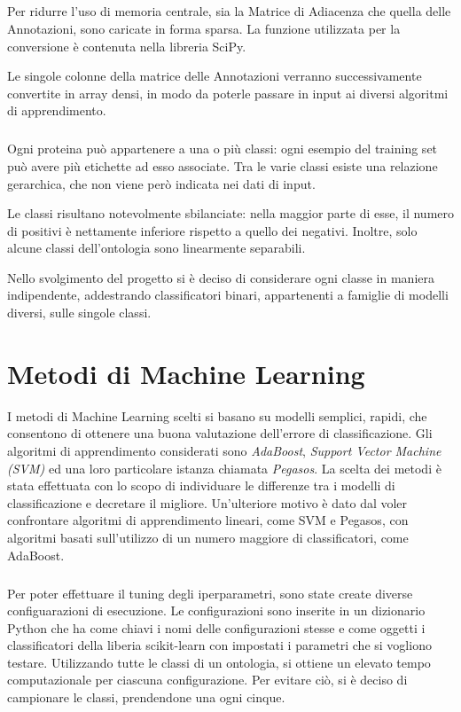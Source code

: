 \documentclass[12pt,a4paper,oneside,hidelinks]{report}
\begin{document}
\paragraph*{} 
Per ridurre l'uso di memoria centrale, sia la Matrice di Adiacenza che quella delle Annotazioni, sono caricate in forma sparsa. La funzione utilizzata per la conversione è contenuta nella libreria SciPy.

Le singole colonne della matrice delle Annotazioni verranno successivamente convertite in array densi, in modo da poterle passare in input ai diversi algoritmi di apprendimento. 

\paragraph*{}
Ogni proteina può appartenere a una o più classi: ogni esempio del training set può avere più etichette ad esso associate. Tra le varie classi esiste una relazione gerarchica, che non viene però indicata nei dati di input.

Le classi risultano notevolmente sbilanciate: nella maggior parte di esse, il numero di positivi è nettamente inferiore rispetto a quello dei negativi. Inoltre, solo alcune classi dell'ontologia sono linearmente separabili. 

Nello svolgimento del progetto si è deciso di considerare ogni classe in maniera indipendente, addestrando classificatori binari, appartenenti a famiglie di modelli diversi, sulle singole classi.


\chapter{Metodi di Machine Learning} 
\label{chap:metodi}

I metodi di Machine Learning scelti si basano su modelli semplici, rapidi, che consentono di ottenere una buona valutazione dell'errore di classificazione. Gli algoritmi di apprendimento considerati sono \textit{AdaBoost}, \textit{Support Vector Machine (SVM)} ed una loro particolare istanza chiamata \textit{Pegasos}. La scelta dei metodi è stata effettuata con lo scopo di individuare le differenze tra i modelli di classificazione e decretare il migliore. Un'ulteriore motivo è dato dal voler confrontare algoritmi di apprendimento lineari, come SVM e Pegasos, con algoritmi basati sull'utilizzo di un numero maggiore di classificatori, come AdaBoost.

\paragraph*{}
Per poter effettuare il tuning degli iperparametri, sono state create diverse configuarazioni di esecuzione.
Le configurazioni sono inserite in un dizionario Python che ha come chiavi i nomi delle configurazioni stesse e come oggetti i classificatori della liberia scikit-learn con impostati i parametri che si vogliono testare.
Utilizzando tutte le classi di un ontologia, si ottiene un elevato tempo computazionale per ciascuna configurazione. Per evitare ciò, si è deciso di campionare le classi, prendendone una ogni cinque.
 
\end{document}
